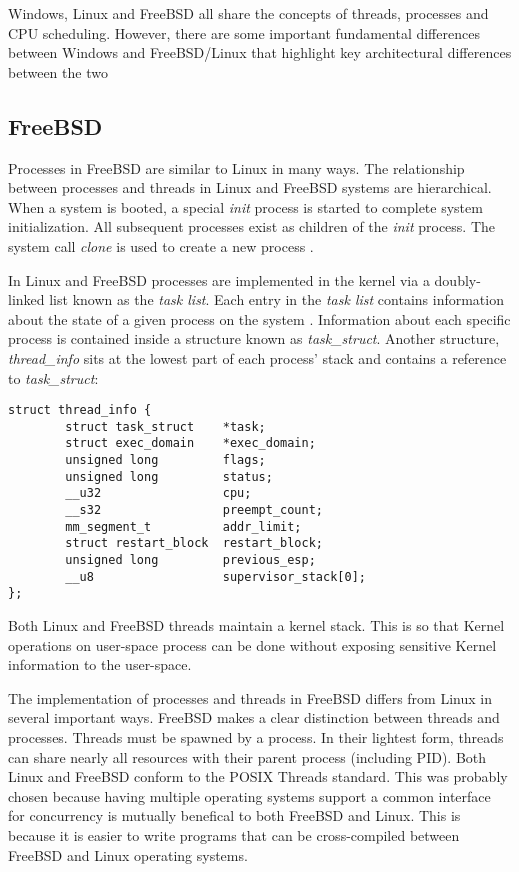 \documentclass[onecolumn,10pt]{IEEETran}
\begin{document}
Windows, Linux and FreeBSD all share the concepts of threads, processes and CPU scheduling.  However, there are some important fundamental differences between Windows and FreeBSD/Linux that highlight key architectural differences between the two

\subsection{FreeBSD}

	Processes in FreeBSD are similar to Linux in many ways.  The relationship between processes and threads in Linux and FreeBSD systems are hierarchical.  When a system is booted, a special \textit{init} process is started to complete system initialization.  All subsequent processes exist as children of the \textit{init} process.  The system call \textit{clone} is used to create a new process \cite{lkd}.

	In Linux and FreeBSD processes are implemented in the kernel via a doubly-linked list known as the \textit{task list}.  Each entry in the \textit{task list} contains information about the state of a given process on the system \cite{lkd}.  Information about each specific process is contained inside a structure known as \textit{task\_struct}.  Another structure, \textit{thread\_info} sits at the lowest part of each process' stack and contains a reference to \textit{task\_struct}:

\begin{lstlisting}
struct thread_info {
        struct task_struct    *task;
        struct exec_domain    *exec_domain;
        unsigned long         flags;
        unsigned long         status;
        __u32                 cpu;
        __s32                 preempt_count;
        mm_segment_t          addr_limit;
        struct restart_block  restart_block;
        unsigned long         previous_esp;
        __u8                  supervisor_stack[0];
};
\end{lstlisting}

	Both Linux and FreeBSD threads maintain a kernel stack.  This is so that Kernel operations on user-space process can be done without exposing sensitive Kernel information to the user-space.

	The implementation of processes and threads in FreeBSD differs from Linux in several important ways.  FreeBSD makes a clear distinction between threads and processes.  Threads must be spawned by a process.  In their lightest form, threads can share nearly all resources with their parent process (including PID).  Both Linux and FreeBSD conform to the POSIX Threads standard.  This was probably chosen because  having multiple operating systems support a common interface for concurrency is mutually benefical to both FreeBSD and Linux.  This is because it is easier to write programs that can be cross-compiled between FreeBSD and Linux operating systems.\cite{lkd}
\end{document}
